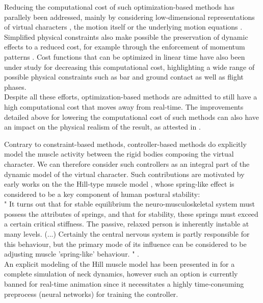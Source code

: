 Reducing the computational cost of such optimization-based methods has parallely been addressed, mainly by considering low-dimensional representations of virtual characters , the motion itself  or the underlying motion equations . Simplified physical constraints also make possible the preservation of dynamic effects to a reduced cost, for example through the enforcement of momentum patterns . Cost functions that can be optimized in linear time have also been under study  for decreasing this computational cost, highlighting a wide range of possible physical constraints such as bar and ground contact as well as flight phases.\\

Despite all these efforts, optimization-based methods are admitted to still have a high computational cost that moves away from real-time. The improvements detailed above for lowering the computational cost of such methods can also have an impact on the physical realism of the result, as attested in .


				\label{subsubsubsubsec:CA_MC_Physics_Controllers}

Contrary to constraint-based methods, controller-based methods do explicitly model the muscle activity between the rigid bodies composing the virtual character. We can therefore consider such controllers as an integral part of the dynamic model of the virtual character. Such contributions are motivated by early works on the the Hill-type muscle model , whose spring-like effect is considered to be a key component of human postural stability:\\

" It turns out that for stable equilibrium the neuro-musculoskeletal system must possess the attributes of springs, and that for stability, these springs must exceed a certain critical stiffness. The passive, relaxed person is inherently instable at many levels. (...) Certainly the central nervous system is partly responsible for this behaviour, but the primary mode of its influence can be considered to be adjusting muscle 'spring-like' behaviour. " .\\ %

An explicit modeling of the Hill muscle model has been presented in  for a complete simulation of neck dynamics, however such an option is currently banned for real-time animation since it necessitates a highly time-consuming preprocess (neural networks) for training the controller.\\

